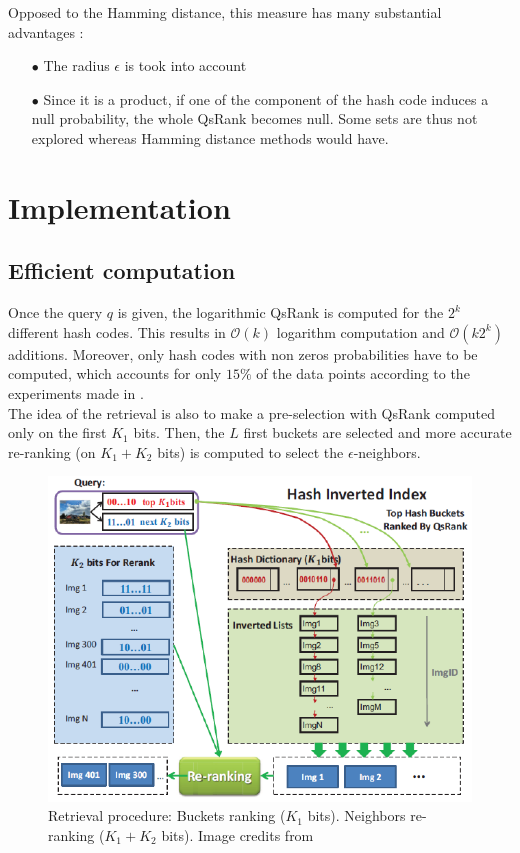 \documentclass{article}
\begin{document}
Opposed to the Hamming distance, this measure has many substantial advantages :
\begin{enumerate}
	\item[$\bullet$] The radius $\epsilon$ is took into account	
	\item[$\bullet$] Since it is a product, if one of the component of the hash code induces a null probability, the whole QsRank becomes null. Some sets are thus not explored whereas Hamming distance methods would have.
\end{enumerate}

\section{Implementation}

\subsection{Efficient computation}

Once the query $q$ is given, the logarithmic QsRank is computed for the $2^k$ different hash codes. This results in $\mathcal{O}(k)$ logarithm computation and $\mathcal{O}(k 2^k)$ additions. Moreover, only hash codes with non zeros probabilities have to be computed, which accounts for only $15\%$ of the data points according to the experiments made in \citep{QSRank}.\\
The idea of the retrieval is also to make a pre-selection with QsRank computed only on the first $K_1$ bits. Then, the $L$ first buckets are selected and more accurate re-ranking (on $K_1+K_2$ bits) is computed to select the $\epsilon$-neighbors.

\begin{figure}[htbp]
	\begin{center}
	\includegraphics[width=.6\linewidth]{Images/algo.png}
	\end{center}
	\caption{Retrieval procedure: Buckets ranking ($K_1$ bits). Neighbors re-ranking ($K_1+K_2$ bits). Image credits from \citep{QSRank}}
	\label{fig:algo}
\end{figure}
\end{document}
